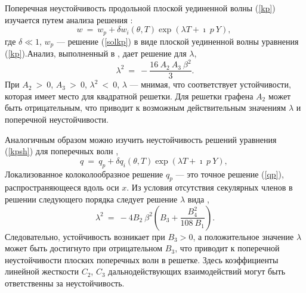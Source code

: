 Поперечная неустойчивость продольной плоской уединенной волны (\ref {kp}) изучается путем анализа решения \cite{Ablowitz}:
\begin{equation}
	w~=~w_p+\delta w_i (\theta,T)\exp (\lambda T +\imath~p~ Y),~\label{stlong}
\end{equation}
где $ \delta \ll 1 $, $ w_p $ --- решение (\ref {solkp}) в виде плоской уединенной волны уравнения (\ref{kp}).Анализ, выполненный в \cite{porkros}, дает решение для $\lambda$,
\begin{equation}
	\lambda^2~=~-\frac{16~A_2~ A_3~\beta^2}{3}.
\end{equation}
При $ A_2 ~> ~ 0 $, $ A_3 ~> ~ 0 $, $ \lambda ^ 2 ~ <~ 0 $, $ \lambda $ --- мнимая, что соответствует устойчивости, которая имеет место для квадратной решетки. Для решетки графена $ A_2 $ может быть отрицательным, что приводит к возможным действительным значениям $ \lambda $ и поперечной неустойчивости.

Аналогичным образом можно изучить неустойчивость решений уравнения (\ref {kpsh}) для поперечных волн \cite{porkros},
\begin{equation}
	q~=~q_p+\delta q_i (\theta,T)\exp (\lambda T +\imath~p~ Y),~\label{stshear}
\end{equation}
Локализованное колоколообразное решение $q_p$ --- это точное решение (\ref {qp}), распространяющееся вдоль оси $ x $.
Из условия отсутствия секулярных членов в решении следующего порядка следует решение $ \lambda $ вида \cite {porkros},
\[
\lambda^2~=~-4 B_2~\beta^2\left(B_3 +\frac{B_4^2}{108~B_1}\right).
\]
Следовательно, устойчивость возникает при $ B_3> 0 $, а положительное значение $ \lambda $ может быть достигнуто при отрицательном $ B_3 $, что приводит к поперечной неустойчивости плоских поперечных волн в решетке. Здесь коэффициенты линейной жесткости $ C_2 $, $ C_3 $ дальнодействующих взаимодействий могут быть ответственны за неустойчивость.


